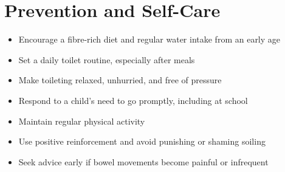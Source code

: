 \section*{Prevention and Self-Care}
\begin{itemize}
    \item Encourage a fibre-rich diet and regular water intake from an early age
    \item Set a daily toilet routine, especially after meals
    \item Make toileting relaxed, unhurried, and free of pressure
    \item Respond to a child's need to go promptly, including at school
    \item Maintain regular physical activity
    \item Use positive reinforcement and avoid punishing or shaming soiling
    \item Seek advice early if bowel movements become painful or infrequent
\end{itemize}
